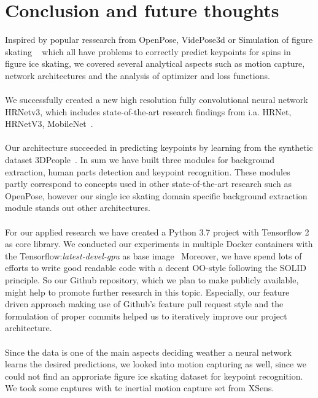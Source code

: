 \chapter{Conclusion and future thoughts}
\label{conclusion}
Inspired by popular ressearch from OpenPose, VidePose3d or Simulation of figure skating ~\cite{openpose, videopose3d, figureskatingsimulation}
which all have problems to correctly predict keypoints for spins in figure ice skating, we covered several
analytical aspects such as motion capture, network architectures and the analysis of optimizer and loss functions.
\\\mbox{}\\
We successfully created a new high resolution fully convolutional neural network HRNetv3, which includes state-of-the-art
research findings from i.a. HRNet, HRNetV3, MobileNet~\cite{HRNetv1, HRNetv2, mobilenet}.
\\\mbox{}\\
Our architecture succeeded in predicting keypoints by learning from the synthetic dataset 3DPeople~\cite{3dpeople}.
In sum we have built three modules for background extraction, human parts detection and keypoint recognition.
These modules partly correspond to concepts used in other state-of-the-art research such as OpenPose, however our
single ice skating domain specific background extraction module stands out other architectures.
\\\mbox{}\\
For our applied research we have created a Python 3.7 project with Tensorflow 2~\cite{tensorflow2} as core library.
We conducted our experiments in multiple Docker containers with the Tensorflow:\textit{latest-devel-gpu} as base
image~\cite{tensorflowdocker}
Moreover, we have spend lots of efforts to write good readable code with a decent OO-style following the SOLID principle.
So our Github repository, which we plan to make publicly available, might help to promote further research in this topic.
Especially, our feature driven approach making use of Github's feature pull request style and the formulation of proper
commits helped us to iteratively improve our project architecture.
\\\mbox{}\\
Since the data is one of the main aspects deciding weather a neural network learns the desired predictions, we looked into
motion capturing as well, since we could not find an approriate figure ice skating dataset for keypoint recognition.
We took some captures with te inertial motion capture set from XSens.
